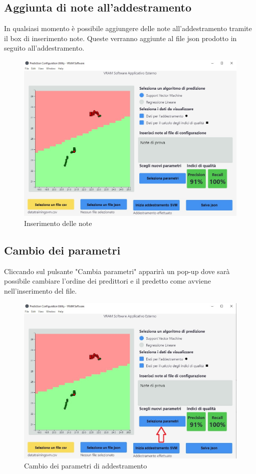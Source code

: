 	\subsection{Aggiunta di note all'addestramento}
	In qualsiasi momento è possibile aggiungere delle note all'addestramento tramite il box di inserimento note. Queste verranno aggiunte al file json prodotto in seguito all'addestramento.
	\begin{figure}[H] 	
		\begin{center}
			\includegraphics[width=\linewidth]{img/7.jpg}
		\end{center}
		\caption{Inserimento delle note}	
	\end{figure}
		
	\subsection{Cambio dei parametri}
	Cliccando sul pulsante "Cambia parametri" apparirà un pop-up dove sarà possibile cambiare l'ordine dei predittori e il predetto come avviene nell'inserimento del file.
	\begin{figure}[H] 	
		\begin{center}
			\includegraphics[width=\linewidth]{img/9.jpg}
		\end{center}
		\caption{Cambio dei parametri di addestramento}	
	\end{figure}

